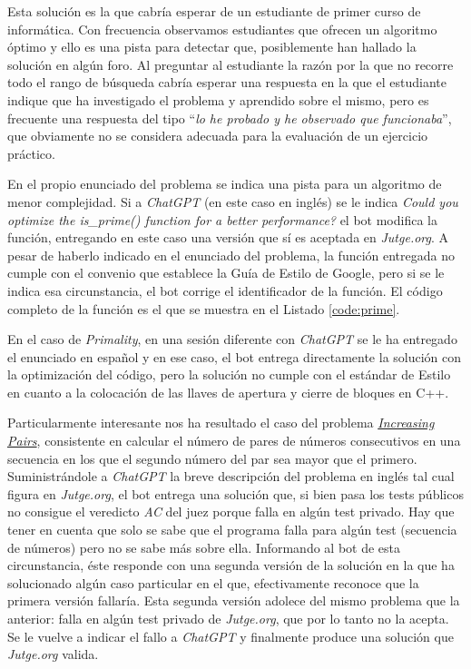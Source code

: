 \documentclass[twocolumn,twoside,a4paper, 10pt]{article}
\newcommand{\jutge}{\textit{Jutge.org}{}}           %
\newcommand{\ChatGPT}{\textit{ChatGPT}{}}           %
\begin{document}
Esta solución es la que cabría esperar de un estudiante de primer curso de informática.
Con frecuencia observamos estudiantes que ofrecen un algoritmo óptimo y ello es una pista para detectar que,
posiblemente han hallado la solución en algún foro. 
Al preguntar al estudiante la razón por la que no recorre todo el rango de búsqueda cabría esperar una
respuesta en la que el estudiante indique que ha investigado el problema y aprendido sobre el mismo, pero es
frecuente una respuesta del tipo ``\textit{lo he probado y he observado que funcionaba}'', que obviamente no se
considera adecuada para la evaluación de un ejercicio práctico.

En el propio enunciado del problema se indica una pista para un algoritmo de menor complejidad.
Si a \ChatGPT{} (en este caso en inglés) se le indica
\textit{Could you optimize the is\_prime() function for a better performance?}
el bot modifica la función, entregando en este caso una versión que sí es aceptada en \textit{Jutge.org}.
A pesar de haberlo indicado en el enunciado del problema, la función entregada no cumple con el convenio que
establece la Guía de Estilo de Google, pero si se le indica esa circunstancia, el bot corrige el identificador
de la función. 
El código completo de la función es el que se muestra en el Listado \ref{code:prime}.

En el caso de \textit{Primality}, en una sesión diferente con \ChatGPT{} se le ha entregado el enunciado en español y
en ese caso, el bot entrega directamente la solución con la optimización del código, pero la solución no cumple
con el estándar de Estilo en cuanto a la colocación de las llaves de apertura y cierre de bloques en C++.

Particularmente interesante nos ha resultado el caso del problema
\href{https://jutge.org/problems/P73501_en/statement}{\textit{Increasing Pairs}}, 
consistente en calcular el número de pares de números consecutivos en una secuencia en los que el segundo
número del par sea mayor que el primero.
Suministrándole a \ChatGPT{} la breve descripción del problema en inglés tal cual figura en \jutge{}, el bot
entrega una solución que, si bien pasa los tests públicos no consigue el veredicto \textit{AC} del juez porque
falla en algún test privado.
Hay que tener en cuenta que solo se sabe que el programa falla para algún test (secuencia de números) pero no
se sabe más sobre ella.
Informando al bot de esta circunstancia, éste responde con una segunda versión de la solución en la que ha
solucionado algún caso particular en el que, efectivamente reconoce que la primera versión fallaría.
Esta segunda versión adolece del mismo problema que la anterior: falla en algún test privado de \jutge{}, que
por lo tanto no la acepta.
Se le vuelve a indicar el fallo a \ChatGPT{} y finalmente produce una solución que \jutge{} valida.
\end{document}

